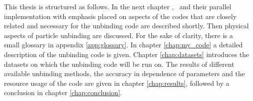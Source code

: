 This thesis is structured as follows. 
In the next chapter \ramses, \phew\ and their parallel implementation with emphasis placed on aspects of the codes that are closely related and necessary for the unbinding code are described shortly. 
Then physical aspects of particle unbinding are discussed.
For the sake of clarity, there is a small glossary in appendix \ref{app:glossary}.
In chapter \ref{chap:my_code} a detailed description of the unbinding code is given. 
Chapter \ref{chap:datasets} introduces the datasets on which the unbinding code will be run on.
The results of different available unbinding methods, the accuracy in dependence of parameters and the resource usage of the code are given in chapter \ref{chap:results}, followed by a conclusion in chapter \ref{chap:conclusion}.




